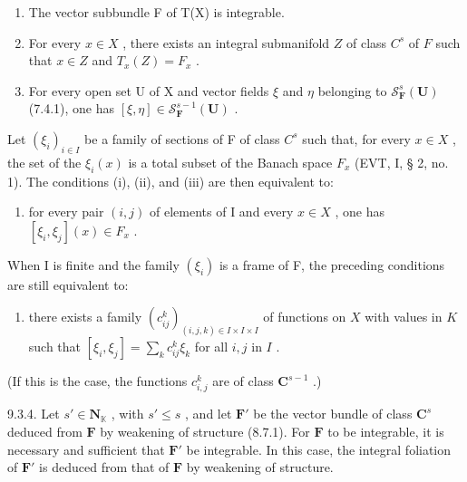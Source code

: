 \begin{enumerate}
\def\labelenumi{(\roman{enumi})}
\item
  The vector subbundle F of T(X) is integrable.
\item
  For every \(x \in X\) , there exists an integral submanifold \(Z\) of class \(C^s\) of \(F\) such that \(x \in Z\) and \(T_x(Z) = F_x\) .
\item
  For every open set U of X and vector fields \(\xi\) and \(\eta\) belonging to \(\mathcal{S}_{\mathbf{F}}^{s}(\mathbf{U})\) (7.4.1), one has \([\xi, \eta] \in \mathcal{S}_{\mathbf{F}}^{s-1}(\mathbf{U})\) .
\end{enumerate}

Let \((\xi_{i})_{i\in I}\) be a family of sections of F of class \(C^{s}\) such that, for every \(x\in X\) , the set of the \(\xi_{i}(x)\) is a total subset of the Banach space \(F_{x}\) (EVT, I, § 2, no. 1). The conditions (i), (ii), and (iii) are then equivalent to:

\begin{enumerate}
\def\labelenumi{(\roman{enumi})}
\setcounter{enumi}{3}
\tightlist
\item
  for every pair \((i,j)\) of elements of I and every \(x\in X\) , one has \([\xi_i,\xi_j](x)\in F_x\) .
\end{enumerate}

When I is finite and the family \((\xi_{i})\) is a frame of F, the preceding conditions are still equivalent to:

\begin{enumerate}
\def\labelenumi{(\alph{enumi})}
\setcounter{enumi}{21}
\tightlist
\item
  there exists a family \((c_{ij}^{k})_{(i,j,k)\in I\times I\times I}\) of functions on \(X\) with values in \(K\) such that \([\xi_i,\xi_j] = \sum_{k}c_{ij}^k\xi_k\) for all \(i,j\) in \(I\) .
\end{enumerate}

(If this is the case, the functions \(c_{i,j}^{k}\) are of class \(\mathbf{C}^{s-1}\) .)

9.3.4. Let \(s' \in \mathbf{N}_{\mathbb{K}}\) , with \(s' \leqslant s\) , and let \(\mathbf{F}'\) be the vector bundle of class \(\mathbf{C}^{s}\) deduced from \(\mathbf{F}\) by weakening of structure (8.7.1). For \(\mathbf{F}\) to be integrable, it is necessary and sufficient that \(\mathbf{F}'\) be integrable. In this case, the integral foliation of \(\mathbf{F}'\) is deduced from that of \(\mathbf{F}\) by weakening of structure.

